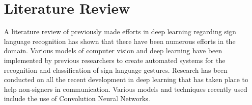 \chapter{Literature Review}

A literature review of previously made efforts in deep learning regarding sign language recognition has shown that there have been numerous efforts in the domain. Various models of computer vision and deep learning have been implemented by previous researchers to create automated systems for the recognition and classification of sign language gestures. Research has been conducted on all the recent development in deep learning that has taken place to help non-signers in communication. Various models and techniques recently used include the use of Convolution Neural Networks.
